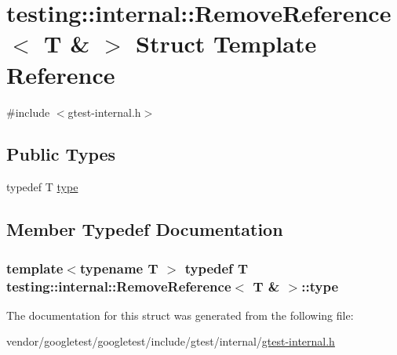 \hypertarget{structtesting_1_1internal_1_1RemoveReference_3_01T_01_6_01_4}{}\section{testing\+:\+:internal\+:\+:Remove\+Reference$<$ T \& $>$ Struct Template Reference}
\label{structtesting_1_1internal_1_1RemoveReference_3_01T_01_6_01_4}


{\ttfamily \#include $<$gtest-\/internal.\+h$>$}

\subsection*{Public Types}
\begin{DoxyCompactItemize}
\item 
typedef T \hyperlink{structtesting_1_1internal_1_1RemoveReference_3_01T_01_6_01_4_a3d0f32a66759f333c2dd66aa31005e6d}{type}
\end{DoxyCompactItemize}


\subsection{Member Typedef Documentation}
\subsubsection[{\texorpdfstring{type}{type}}]{\setlength{\rightskip}{0pt plus 5cm}template$<$typename T $>$ typedef T {\bf testing\+::internal\+::\+Remove\+Reference}$<$ T \& $>$\+::{\bf type}}\hypertarget{structtesting_1_1internal_1_1RemoveReference_3_01T_01_6_01_4_a3d0f32a66759f333c2dd66aa31005e6d}{}\label{structtesting_1_1internal_1_1RemoveReference_3_01T_01_6_01_4_a3d0f32a66759f333c2dd66aa31005e6d}


The documentation for this struct was generated from the following file\+:\begin{DoxyCompactItemize}
\item 
vendor/googletest/googletest/include/gtest/internal/\hyperlink{gtest-internal_8h}{gtest-\/internal.\+h}\end{DoxyCompactItemize}
